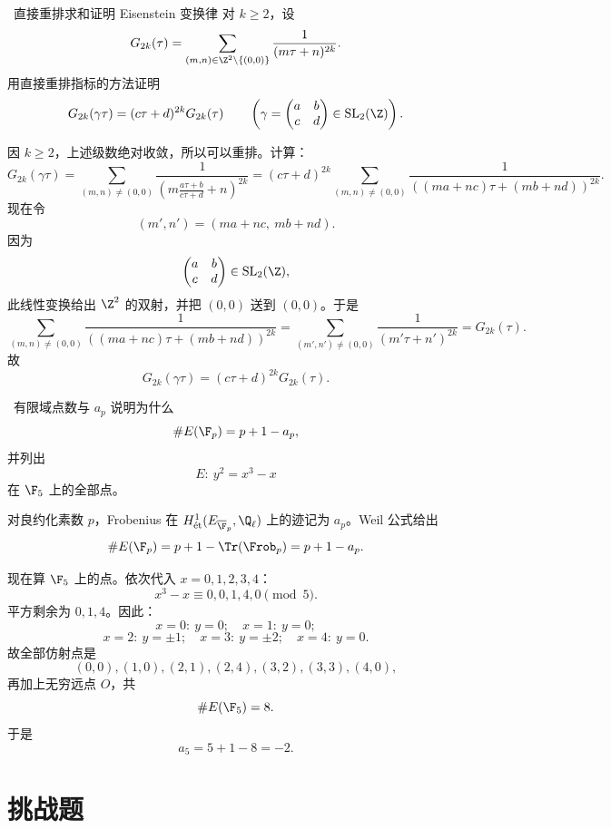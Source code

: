 \begin{problem}{\medium\ 直接重排求和证明 Eisenstein 变换律}
对 $k\ge2$，设
\[
G_{2k}(\tau)=\sum_{(m,n)\in\Z^2\setminus\{(0,0)\}}\frac{1}{(m\tau+n)^{2k}}.
\]
用直接重排指标的方法证明
\[
G_{2k}(\gamma\tau)=(c\tau+d)^{2k}G_{2k}(\tau)
\qquad
\left(\gamma=\begin{pmatrix}a&b\\c&d\end{pmatrix}\in \mathrm{SL}_2(\Z)\right).
\]
\end{problem}
\begin{solution}
因 $k\ge2$，上述级数绝对收敛，所以可以重排。计算：
\[
G_{2k}(\gamma\tau)
=\sum_{(m,n)\neq(0,0)}
\frac{1}{\left(m\frac{a\tau+b}{c\tau+d}+n\right)^{2k}}
=(c\tau+d)^{2k}
\sum_{(m,n)\neq(0,0)}
\frac{1}{((ma+nc)\tau+(mb+nd))^{2k}}.
\]
现在令
\[
(m',n')=(ma+nc,\ mb+nd).
\]
因为
\[
\begin{pmatrix}a&b\\c&d\end{pmatrix}\in \mathrm{SL}_2(\Z),
\]
此线性变换给出 $\Z^2$ 的双射，并把 $(0,0)$ 送到 $(0,0)$。于是
\[
\sum_{(m,n)\neq(0,0)}
\frac{1}{((ma+nc)\tau+(mb+nd))^{2k}}
=
\sum_{(m',n')\neq(0,0)}
\frac{1}{(m'\tau+n')^{2k}}
=G_{2k}(\tau).
\]
故
\[
G_{2k}(\gamma\tau)=(c\tau+d)^{2k}G_{2k}(\tau).
\]
\end{solution}

\begin{problem}{\medium\ 有限域点数与 $a_p$}
说明为什么
\[
\#E(\F_p)=p+1-a_p,
\]
并列出
\[
E:\ y^2=x^3-x
\]
在 $\F_5$ 上的全部点。
\end{problem}
\begin{solution}
对良约化素数 $p$，Frobenius 在 $H^1_{\text{\'et}}(E_{\overline{\F}_p},\Q_\ell)$ 上的迹记为 $a_p$。Weil 公式给出
\[
\#E(\F_p)=p+1-\Tr(\Frob_p)=p+1-a_p.
\]

现在算 $\F_5$ 上的点。依次代入 $x=0,1,2,3,4$：
\[
x^3-x\equiv 0,0,1,4,0 \pmod5.
\]
平方剩余为 $0,1,4$。因此：
\[
x=0:\ y=0;
\quad
x=1:\ y=0;
\]
\[
x=2:\ y=\pm1;
\quad
x=3:\ y=\pm2;
\quad
x=4:\ y=0.
\]
故全部仿射点是
\[
(0,0),(1,0),(2,1),(2,4),(3,2),(3,3),(4,0),
\]
再加上无穷远点 $O$，共
\[
\#E(\F_5)=8.
\]
于是
\[
a_5=5+1-8=-2.
\]
\end{solution}

\section{挑战题 \hard}

